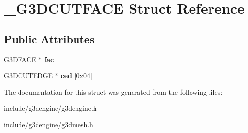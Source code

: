 \hypertarget{struct__G3DCUTFACE}{}\section{\+\_\+\+G3\+D\+C\+U\+T\+F\+A\+CE Struct Reference}
\label{struct__G3DCUTFACE}
\subsection*{Public Attributes}
\begin{DoxyCompactItemize}
\item 
\mbox{\label{struct__G3DCUTFACE_aec00b230e0ec9237b1cea2810af7a9ec}} 
\hyperlink{struct__G3DFACE}{G3\+D\+F\+A\+CE} $\ast$ {\bfseries fac}
\item 
\mbox{\label{struct__G3DCUTFACE_acf739f99b94cd6ce991686a4060fd03f}} 
\hyperlink{struct__G3DCUTEDGE}{G3\+D\+C\+U\+T\+E\+D\+GE} $\ast$ {\bfseries ced} \mbox{[}0x04\mbox{]}
\end{DoxyCompactItemize}


The documentation for this struct was generated from the following files\+:\begin{DoxyCompactItemize}
\item 
include/g3dengine/g3dengine.\+h\item 
include/g3dengine/g3dmesh.\+h\end{DoxyCompactItemize}
